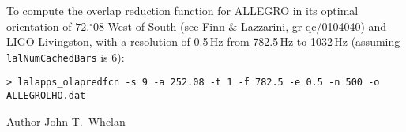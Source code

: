 \begin{entry}
To compute the overlap reduction function for ALLEGRO in its optimal
orientation of $72.\!\!^\circ08$ West of South (see Finn \& Lazzarini,
gr-qc/0104040) and LIGO Livingston, with a resolution of 0.5\,Hz
from 782.5\,Hz to 1032\,Hz (assuming \texttt{lalNumCachedBars} is 6):

\begin{verbatim}
> lalapps_olapredfcn -s 9 -a 252.08 -t 1 -f 782.5 -e 0.5 -n 500 -o ALLEGROLHO.dat
\end{verbatim}

\item[Author]
John T.~Whelan

\end{entry}
